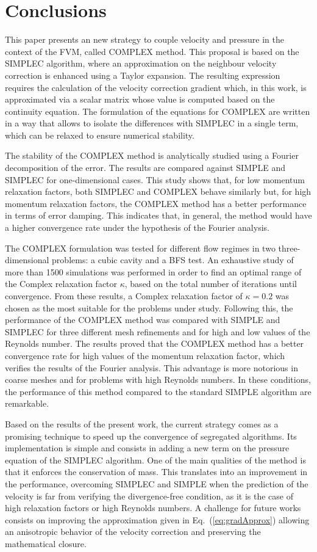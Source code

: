 \documentclass[final,3p,times,11pt,onecolumn]{myElsarticle}
\numberwithin{equation}{section}
\begin{document}
\section{Conclusions}
\label{sec:conclusions}
This paper presents an new strategy to couple velocity and pressure in the context of the FVM, called COMPLEX method. This proposal is based on the SIMPLEC algorithm, where an approximation on the neighbour velocity correction is enhanced using a Taylor expansion. The resulting expression requires the calculation of the velocity correction gradient which, in this work, is approximated via a scalar matrix whose value is computed based on the continuity equation. The formulation of the equations for COMPLEX are written in a way that allows to isolate the differences with SIMPLEC in a single term, which can be relaxed to ensure numerical stability.

The stability of the COMPLEX method is analytically studied using a Fourier decomposition of the error. The results are compared against SIMPLE and SIMPLEC for one-dimensional cases. This study shows that, for low momentum relaxation factors, both SIMPLEC and COMPLEX behave similarly but, for high momentum relaxation factors, the COMPLEX method has a better performance in terms of error damping. This indicates that, in general, the method would have a higher convergence rate under the hypothesis of the Fourier analysis.

The COMPLEX formulation was tested for different flow regimes in two three-dimensional problems: a cubic cavity and a BFS test. An exhaustive study of more than 1500 simulations was performed in order to find an optimal range of the Complex relaxation factor $\kappa$, based on the total number of iterations until convergence. From these results, a Complex relaxation factor of $\kappa = 0.2$ was chosen as the most suitable for the problems under study. Following this, the performance of the COMPLEX method was compared with SIMPLE and SIMPLEC for three different mesh refinements and for high and low values of the Reynolds number. The results proved that the COMPLEX method has a better convergence rate for high values of the momentum relaxation factor, which verifies the results of the Fourier analysis. This advantage is more notorious in coarse meshes and for problems with high Reynolds numbers. In these conditions, the performance of this method compared to the standard SIMPLE algorithm are remarkable.

Based on the results of the present work, the current strategy comes as a promising technique to speed up the convergence of segregated algorithms. Its implementation is simple and consists in adding a new term on the pressure equation of the SIMPLEC algorithm. One of the main qualities of the method is that it enforces the conservation of mass. This translates into an improvement in the performance, overcoming SIMPLEC and SIMPLE when the prediction of the velocity is far from verifying the divergence-free condition, as it is the case of high relaxation factors or high Reynolds numbers. A challenge for future works consists on improving the approximation given in Eq.~(\ref{eq:gradApprox}) allowing an anisotropic behavior of the velocity correction and preserving the mathematical closure.



\end{document}
